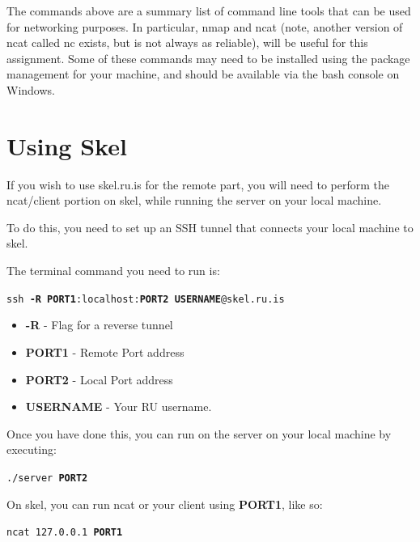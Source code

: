 \documentclass[9pt, addpoints]{exam}
\begin{document}

The commands above are a summary list of command line tools that can be used
for networking purposes. In particular, nmap and ncat (note, another 
version of ncat called nc exists, but is not always as reliable), 
will be useful for this assignment. Some of these commands may need to 
be installed using the package management for your machine, and should be
available via the bash console on Windows.

\section*{Using Skel}
If you wish to use skel.ru.is for the remote part, you will need to perform the ncat/client portion on skel, while running the server on your local machine.

To do this, you need to set up an SSH tunnel that connects your local machine to skel.

The terminal command you need to run is:

\begin{flushleft}
\texttt{ssh \textbf{-R PORT1}:localhost:\textbf{PORT2} \textbf{USERNAME}@skel.ru.is}
\end{flushleft}

\begin{itemize}
    \itemsep0em 
    \item \textbf{-R} - Flag for a reverse tunnel
    \item \textbf{PORT1} - Remote Port address
    \item \textbf{PORT2} - Local Port address
    \item \textbf{USERNAME} - Your RU username.
\end{itemize}

Once you have done this, you can run on the server on your local machine by executing:
\begin{flushleft}
\texttt{./server \textbf{PORT2}}
\end{flushleft}

On skel, you can run ncat or your client using \textbf{PORT1}, like so:

\begin{flushleft}
\texttt{ncat 127.0.0.1 \textbf{PORT1}}
\end{flushleft}

\end{document}

